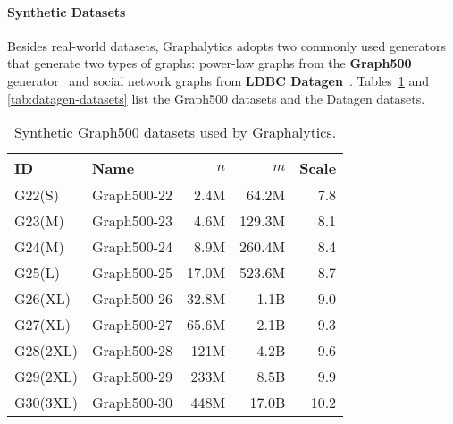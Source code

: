 \paragraph{Synthetic Datasets} Besides real-world datasets, Graphalytics adopts two commonly used generators that generate two types of graphs: power-law graphs from the \textbf{Graph500} generator~\cite{chakrabarti2004, murphy2010} and social network graphs from \textbf{LDBC Datagen}~\cite{DBLP:conf/sigmod/ErlingALCGPPB15}. Tables~\ref{tab:graph500-datasets} and \ref{tab:datagen-datasets} list the Graph500 datasets and the Datagen datasets.



\begin{table}[h]
\caption{Synthetic Graph500 datasets used by Graphalytics.}
\label{tab:graph500-datasets}
\centering
\begin{tabular}{|l|l|r|r|r|}
	\hline
	\textbf{ID} & \textbf{Name} &   $n$ &    $m$ & \textbf{Scale} \\ \hline\hline
	G22(S)      & Graph500-22   &  2.4M &  64.2M &            7.8 \\ \hline
	G23(M)      & Graph500-23   &  4.6M & 129.3M &            8.1 \\ \hline
	G24(M)      & Graph500-24   &  8.9M & 260.4M &            8.4 \\ \hline
	G25(L)      & Graph500-25   & 17.0M & 523.6M &            8.7 \\ \hline
	G26(XL)     & Graph500-26   & 32.8M &   1.1B &            9.0 \\ \hline
	G27(XL)     & Graph500-27   & 65.6M &   2.1B &            9.3 \\ \hline
	G28(2XL)    & Graph500-28   &  121M &   4.2B &            9.6 \\ \hline
	G29(2XL)    & Graph500-29   &  233M &   8.5B &            9.9 \\ \hline
	G30(3XL)    & Graph500-30   &  448M &  17.0B &           10.2 \\ \hline
\end{tabular}
\end{table}


